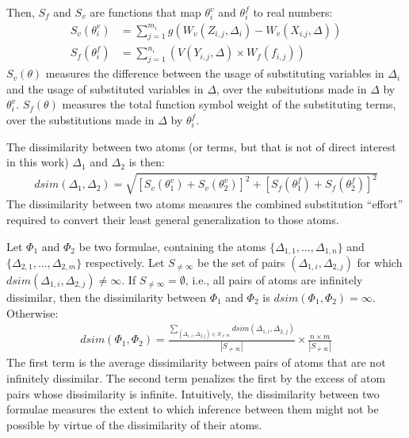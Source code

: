 \documentclass[EPiC]{easychair}
\begin{document}
Then, $S_f$ and $S_v$ are functions that map $\theta_i^v$ and 
$\theta_i^f$ to real numbers:
\begin{align}
S_v(\theta_i^v) &= \sum_{j=1}^{m_i} g(W_v(Z_{i,j},\Delta_i) - W_v(X_{i.j},\Delta)) \\
S_f(\theta_i^f) &= \sum_{j=1}^{n_i} (V(Y_{i,j},\Delta) \times W_f(f_{i,j}))
\end{align}
$S_v(\theta)$ measures the difference between the usage of substituting 
variables in $\Delta_i$ and the usage of substituted variables 
in $\Delta$, over the subsitutions made in $\Delta$ by $\theta_i^v$.
$S_f(\theta)$ measures the total function symbol weight of the substituting 
terms, over the substitutions made in $\Delta$ by $\theta_i^f$.

The dissimilarity between two atoms (or terms, but that is not of direct
interest in this work) $\Delta_1$ and $\Delta_2$ is then:
\begin{align}
dsim(\Delta_1,\Delta_2) = \sqrt{[S_v(\theta_1^v)+S_v(\theta_2^v)]^2+[S_f(\theta_1^f)+S_f(\theta_2^f)]^2}
\end{align}
The dissimilarity between two atoms measures the combined substitution
``effort'' required to convert their least general generalization to those 
atoms.

Let $\Phi_1$ and $\Phi_2$ be two formulae, containing the atoms
$\{\Delta_{1,1},\dots,\Delta_{1,n}\}$ and 
$\{\Delta_{2,1},\dots,\Delta_{2,m}\}$ respectively.
Let $S_{\neq\infty}$ be the set of pairs $(\Delta_{1,i},\Delta_{2,j})$ 
for which $dsim(\Delta_{1,i},\Delta_{2,j}) \neq \infty$.
If $S_{\neq\infty} = \emptyset$, i.e., all pairs of atoms are infinitely 
dissimilar, then the dissimilarity between $\Phi_1$ and $\Phi_2$ is 
$dsim(\Phi_1,\Phi_2) = \infty$.
Otherwise:
\begin{align}
dsim(\Phi_1,\Phi_2) = 
\frac{\sum_{(\Delta_{1,i},\Delta_{2,j}) \in S_{\neq\infty}}dsim(\Delta_{1,i},\Delta_{2,j})}
{|S_{\neq\infty}|}
\times
\frac{n \times m}{|S_{\neq\infty}|} 
\end{align}
The first term is the average dissimilarity between pairs of atoms that are 
not infinitely dissimilar.
The second term penalizes the first by the excess of atom pairs whose
dissimilarity is infinite.
Intuitively, the dissimilarity between two formulae measures the extent 
to which inference between them might not be possible by virtue of the 
dissimilarity of their atoms.
\end{document}
